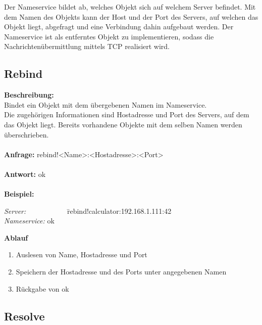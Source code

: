 Der Nameservice bildet ab, welches Objekt sich auf welchem Server befindet. Mit dem Namen des Objekts kann der Host und der Port des Servers, auf welchen das Objekt liegt, abgefragt und eine Verbindung dahin aufgebaut werden. Der Nameservice ist als entferntes Objekt zu implementieren, sodass die Nachrichtenübermittlung mittels TCP realisiert wird.

\subsection{Rebind}

\textbf{Beschreibung:}\\
Bindet ein Objekt mit dem übergebenen Namen im Nameservice.\\
Die zugehörigen Informationen sind Hostadresse und Port des Servers, auf dem das Objekt liegt. Bereits vorhandene Objekte mit dem selben Namen werden überschrieben.\\ \\
\textbf{Anfrage:} rebind!<Name>:<Hostadresse>:<Port>\\ \\
\textbf{Antwort:} ok\\ \\
\textbf{Beispiel:}
\begin{tabbing}
\textit{Server:}~~~~~~~~~~~ \= rebind!calculator:192.168.1.111:42 \\
\textit{Nameservice:} \> ok
\end{tabbing}
\textbf{Ablauf}
\begin{enumerate}
\item Auslesen von Name, Hostadresse und Port
\item Speichern der Hostadresse und des Ports unter angegebenen Namen
\item Rückgabe von ok
\end{enumerate}

\subsection{Resolve}

